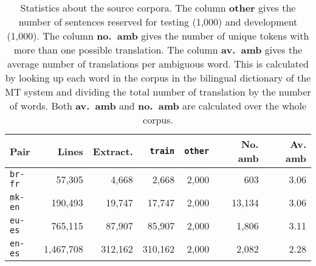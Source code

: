 \documentclass[11pt]{article}
\begin{document}
\begin{table}
\begin{center}
 \begin{tabular}{|l|r|r||r|r|r|r|}
    \hline  
    {\bf Pair}      & {\bf Lines} & {\bf Extract.} & \texttt{train} & \texttt{other} & {\bf No. amb} & {\bf Av. amb} \\ 
    \hline  
     \texttt{br-fr} & 57,305  & 4,668 & 2,668 & 2,000  & 603  & 3.06 \\
    \hline  
     \texttt{mk-en} & 190,493  & 19,747  & 17,747  & 2,000 & 13,134  & 3.06  \\
    \hline
     \texttt{eu-es} & 765,115  & 87,907  & 85,907  & 2,000 & 1,806  & 3.11 \\
    \hline
     \texttt{en-es} & 1,467,708 & 312,162 & 310,162 & 2,000 & 2,082  & 2.28 \\
    \hline  
 \end{tabular}
 \caption{Statistics about the source corpora. The column {\bf other}
   gives the number of sentences reserved for testing (1,000) and
   development (1,000). The column {\bf no.\ amb} gives the number of
   unique tokens with more than one possible translation. The column
   {\bf av.\ amb} gives the average number of translations per ambiguous
   word. This is calculated by looking up each word in the corpus in
   the bilingual dictionary of the MT system and dividing the total
   number of translation by the number of words. Both {\bf av.\ amb}
   and {\bf no.\ amb} are calculated over the whole corpus.}
 \label{table:input-corp}
\end{center}
\end{table}

\end{document}
